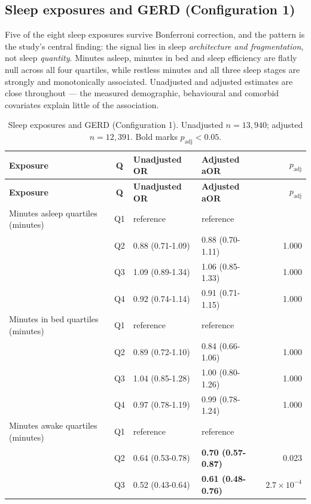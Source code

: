 \documentclass[11pt]{article}
\begin{document}
\subsection{Sleep exposures and GERD (Configuration 1)}
\label{sec:res-sleep}
Five of the eight sleep exposures survive Bonferroni correction, and the pattern is the study's
central finding: the signal lies in sleep \emph{architecture and fragmentation}, not sleep
\emph{quantity}. Minutes asleep, minutes in bed and sleep efficiency are flatly null across all
four quartiles, while restless minutes and all three sleep stages are strongly and monotonically
associated. Unadjusted and adjusted estimates are close throughout --- the measured demographic,
behavioural and comorbid covariates explain little of the association.


\begin{longtable}{@{}p{5.2cm}c p{3.0cm} p{3.0cm} r@{}}
\caption{Sleep exposures and GERD (Configuration 1). Unadjusted $n=13{,}940$; adjusted $n=12{,}391$. Bold marks $p_{\text{adj}}<0.05$.}\label{tab:res-sleep-gerd}\\
\toprule \textbf{Exposure} & \textbf{Q} & \textbf{Unadjusted OR} & \textbf{Adjusted aOR} & \textbf{$p_{\text{adj}}$} \\ \midrule
\endfirsthead \toprule \textbf{Exposure} & \textbf{Q} & \textbf{Unadjusted OR} & \textbf{Adjusted aOR} & \textbf{$p_{\text{adj}}$} \\ \midrule \endhead
Minutes asleep quartiles (minutes) & Q1 & reference & reference & \\
 & Q2 & 0.88 (0.71-1.09) & 0.88 (0.70-1.11) & 1.000 \\
 & Q3 & 1.09 (0.89-1.34) & 1.06 (0.85-1.33) & 1.000 \\
 & Q4 & 0.92 (0.74-1.14) & 0.91 (0.71-1.15) & 1.000 \\
\addlinespace
Minutes in bed quartiles (minutes) & Q1 & reference & reference & \\
 & Q2 & 0.89 (0.72-1.10) & 0.84 (0.66-1.06) & 1.000 \\
 & Q3 & 1.04 (0.85-1.28) & 1.00 (0.80-1.26) & 1.000 \\
 & Q4 & 0.97 (0.78-1.19) & 0.99 (0.78-1.24) & 1.000 \\
\addlinespace
Minutes awake quartiles (minutes) & Q1 & reference & reference & \\
 & Q2 & 0.64 (0.53-0.78) & \textbf{0.70 (0.57-0.87)} & 0.023 \\
 & Q3 & 0.52 (0.43-0.64) & \textbf{0.61 (0.48-0.76)} & $2.7\times10^{-4}$ \\

\end{longtable}
\end{document}
